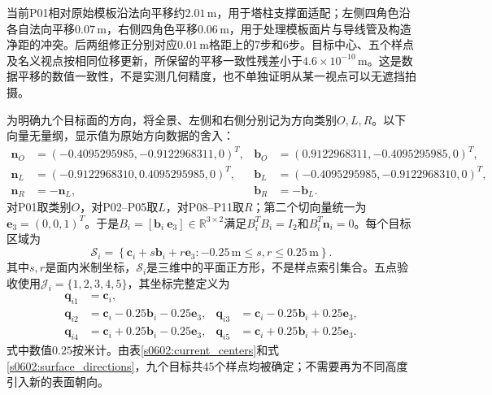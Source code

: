 当前P01相对原始模板沿法向平移约$2.01\,\mathrm m$，用于塔柱支撑面适配；左侧四角色沿各自法向平移$0.07\,\mathrm m$，右侧四角色平移$0.06\,\mathrm m$，用于处理模板面片与导线管及构造净距的冲突。后两组修正分别对应$0.01\,\mathrm m$格距上的7步和6步。目标中心、五个样点及名义视点按相同位移更新，所保留的平移一致性残差小于$4.6\times10^{-10}\,\mathrm m$。这是数据平移的数值一致性，不是实测几何精度，也不单独证明从某一视点可以无遮挡拍摄。

为明确九个目标面的方向，将全景、左侧和右侧分别记为方向类别$O,L,R$。以下向量无量纲，显示值为原始方向数据的舍入：
\begin{align}
 \mathbf n_O&=(-0.4095295985,-0.9122968311,0)^T,
 &\mathbf b_O&=(0.9122968311,-0.4095295985,0)^T,\\
 \mathbf n_L&=(-0.9122968310,0.4095295985,0)^T,
 &\mathbf b_L&=(-0.4095295985,-0.9122968310,0)^T,\\
 \mathbf n_R&=-\mathbf n_L,
 &\mathbf b_R&=-\mathbf b_L.
 \label{s0602:surface_directions}
\end{align}
对P01取类别$O$，对P02--P05取$L$，对P08--P11取$R$；第二个切向量统一为$\mathbf e_3=(0,0,1)^T$。于是$B_i=[\mathbf b_i\ \mathbf e_3]\in\mathbb R^{3\times2}$满足$B_i^TB_i=I_2$和$B_i^T\mathbf n_i=0$。每个目标区域为
\begin{equation}
 \mathcal S_i=
 \left\{\mathbf c_i+s\mathbf b_i+r\mathbf e_3:
 -0.25\,\mathrm m\le s,r\le0.25\,\mathrm m\right\}.
 \label{s0602:numeric_patch}
\end{equation}
其中$s,r$是面内米制坐标，$\mathcal S_i$是三维中的平面正方形，不是样点索引集合。五点验收使用$\mathcal J_i=\{1,2,3,4,5\}$，其坐标完整定义为
\begin{align}
 \mathbf q_{i1}&=\mathbf c_i,\\
 \mathbf q_{i2}&=\mathbf c_i-0.25\mathbf b_i-0.25\mathbf e_3,&
 \mathbf q_{i3}&=\mathbf c_i-0.25\mathbf b_i+0.25\mathbf e_3,\\
 \mathbf q_{i4}&=\mathbf c_i+0.25\mathbf b_i-0.25\mathbf e_3,&
 \mathbf q_{i5}&=\mathbf c_i+0.25\mathbf b_i+0.25\mathbf e_3.
 \label{s0602:five_samples}
\end{align}
式中数值$0.25$按米计。由表\ref{s0602:current_centers}和式\eqref{s0602:surface_directions}，九个目标共45个样点均被确定；不需要再为不同高度引入新的表面朝向。

